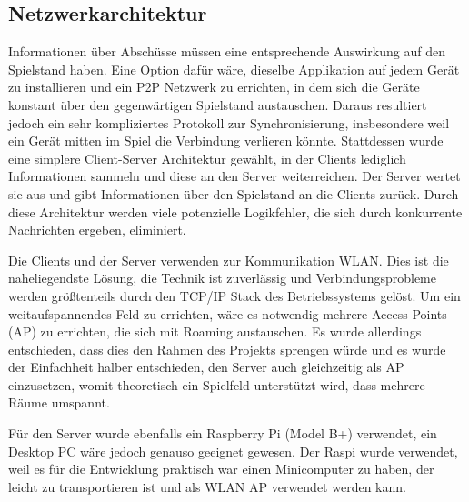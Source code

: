 \subsection{Netzwerkarchitektur}
Informationen über Abschüsse müssen eine entsprechende Auswirkung auf den Spielstand haben.
Eine Option dafür wäre, dieselbe Applikation auf jedem Gerät zu installieren und ein P2P Netzwerk zu
errichten, in dem sich die Geräte konstant über den gegenwärtigen Spielstand austauschen.
Daraus resultiert jedoch ein sehr kompliziertes Protokoll zur Synchronisierung, insbesondere weil
ein Gerät mitten im Spiel die Verbindung verlieren könnte.
Stattdessen wurde eine simplere Client-Server Architektur gewählt, in der Clients lediglich
Informationen sammeln und diese an den Server weiterreichen.
Der Server wertet sie aus und gibt Informationen über den Spielstand an die Clients zurück.
Durch diese Architektur werden viele potenzielle Logikfehler, die sich durch konkurrente Nachrichten
ergeben, eliminiert.

Die Clients und der Server verwenden zur Kommunikation WLAN. Dies ist die naheliegendste Lösung, die
Technik ist zuverlässig und Verbindungsprobleme werden größtenteils durch den TCP/IP Stack des
Betriebssystems gelöst.
Um ein weitaufspannendes Feld zu errichten, wäre es notwendig mehrere Access Points (AP) zu
errichten, die sich mit Roaming austauschen.
Es wurde allerdings entschieden, dass dies den Rahmen des Projekts sprengen würde und es wurde der
Einfachheit halber entschieden, den Server auch gleichzeitig als AP einzusetzen, womit theoretisch
ein Spielfeld unterstützt wird, dass mehrere Räume umspannt.

Für den Server wurde ebenfalls ein Raspberry Pi (Model B+) verwendet, ein Desktop PC wäre jedoch
genauso geeignet gewesen.
Der Raspi wurde verwendet, weil es für die Entwicklung praktisch war einen Minicomputer zu haben,
der leicht zu transportieren ist und als WLAN AP verwendet werden kann.
